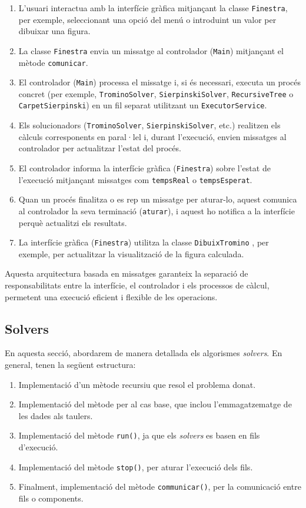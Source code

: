 \documentclass{ieeetj}
\begin{document}
\begin{enumerate}
    \item L'usuari interactua amb la interfície gràfica mitjançant la classe \textsf{\texttt{Finestra}}, per exemple, seleccionant una opció del menú o introduint un valor per dibuixar una figura.
    \item La classe \texttt{Finestra} envia un missatge al controlador (\texttt{Main}) mitjançant el mètode \texttt{comunicar}.
    \item El controlador (\texttt{Main}) processa el missatge i, si és necessari, executa un procés concret (per exemple, \texttt{TrominoSolver}, \texttt{SierpinskiSolver}, \texttt{RecursiveTree} o \texttt{CarpetSierpinski}) en un fil separat utilitzant un \texttt{ExecutorService}.
    \item Els solucionadors (\texttt{TrominoSolver}, \texttt{SierpinskiSolver}, etc.) realitzen els càlculs corresponents en paral·lel i, durant l'execució, envien missatges al controlador per actualitzar l'estat del procés.
    \item El controlador informa la interfície gràfica (\texttt{Finestra}) sobre l'estat de l'execució mitjançant missatges com \texttt{tempsReal} o \texttt{tempsEsperat}.
    \item Quan un procés finalitza o es rep un missatge per aturar-lo, aquest comunica al controlador la seva terminació (\texttt{aturar}), i aquest ho notifica a la interfície perquè actualitzi els resultats.
    \item La interfície gràfica (\texttt{Finestra}) utilitza la classe \texttt{DibuixTromino} , per exemple, per actualitzar la visualització de la figura calculada.
\end{enumerate}

Aquesta arquitectura basada en missatges garanteix la separació de responsabilitats entre la interfície, el controlador i els processos de càlcul, permetent una execució eficient i flexible de les operacions.

\subsection{Solvers}
En aquesta secció, abordarem de manera detallada els algorismes \textit{solvers}. En general, tenen la següent estructura:

\begin{enumerate}
    \item Implementació d'un mètode recursiu que resol el problema donat.
    \item Implementació del mètode per al cas base, que inclou l'emmagatzematge de les dades als taulers.
    \item Implementació del mètode \texttt{run()}, ja que els \textit{solvers} es basen en fils d'execució.
    \item Implementació del mètode \texttt{stop()}, per aturar l'execució dels fils.
    \item Finalment, implementació del mètode \texttt{communicar()}, per la comunicació entre fils o components.
\end{enumerate}
\end{document}
